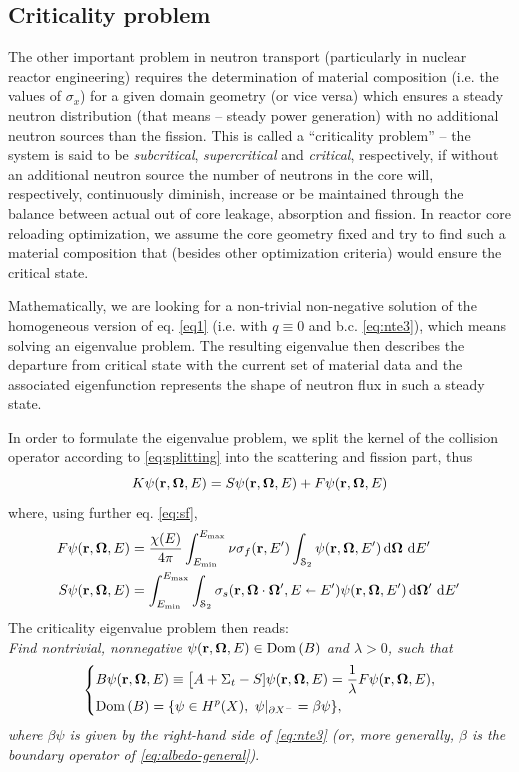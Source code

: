 \subsection{Criticality problem}\label{sec:criticality}

The other important problem in neutron transport (particularly in nuclear reactor engineering) requires the
determination of material composition (i.e. the values of $\sigma_x$) for a given domain geometry (or vice versa)
which ensures a steady neutron distribution (that means -- steady power generation) with no additional neutron sources
than the fission. This is called a ``criticality problem'' -- the system is said to be \textit{subcritical},
\textit{supercritical} and \textit{critical}, respectively, if without an additional neutron source the number of
neutrons in the core will, respectively, continuously diminish, increase or be maintained through the
balance between actual out of core leakage, absorption and fission. In reactor core reloading optimization, we assume
the core geometry fixed and try to find such a material composition that (besides other optimization criteria) would
ensure the critical state. 

Mathematically, we are looking for a non-trivial non-negative solution of the homogeneous
version of eq. \eqref{eq1} (i.e. with $q\equiv 0$ and b.c. \eqref{eq:nte3}), which means solving an eigenvalue
problem. The resulting eigenvalue then describes the departure from critical state with the current set of material
data and the associated eigenfunction represents the shape of neutron flux in such a steady state. 

In order to formulate
the eigenvalue problem, we split the kernel of the collision operator according to \eqref{eq:splitting} into the 
scattering and fission part, thus
$$
K\psi(\br,\bomega,E)
  			= S\psi(\br,\bomega,E) + F\psi(\br,\bomega,E)
$$
where, using further eq. \eqref{eq:sf},
\begin{equation}\label{eq:FScrit}
\begin{aligned}
F\psi(\br,\bomega,E) &= \frac{\chi(E)}{4\pi}\intE[']{\Emin}{\Emax}{\nu\sigma_f(\br,E')\intA{\psi(\br,\bomega,E')}}\\
S\psi(\br,\bomega,E) &= \intE[']{\Emin}{\Emax}{\intA[']{\sigma_s(\br,\bomega\cdot\bomega',E\sla
E')\psi(\br,\bomega,E')}}
\end{aligned}
\end{equation}
The criticality eigenvalue problem then reads:\\
\textit{Find nontrivial, nonnegative $\psi(\br,\bomega,E)\in \Dom{B}$ and $\lambda > 0$, such that}
\begin{equation}\label{eq:critical}
\left\{
  \begin{aligned}
     &B\psi(\br,\bomega,E) \equiv \bigl[A + \Sigma_t - S]\psi(\br,\bomega,E) = \frac{1}{\lambda} F\psi(\br,\bomega,E),\\
     &\Dom{B} = \{\psi\in \Hp(X),\ \psi\vert_{\pX[-]} = \beta\psi\},
  \end{aligned}
\right.
\end{equation}
\textit{where $\beta\psi$ is given by the right-hand side of \eqref{eq:nte3} (or, more generally, $\beta$ is the
boundary operator of \eqref{eq:albedo-general})}.  

